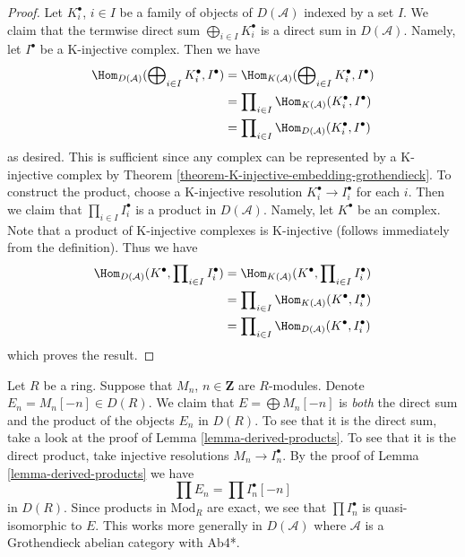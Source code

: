 \begin{proof}
Let $K^\bullet_i$, $i \in I$ be a family of objects of $D(\mathcal{A})$
indexed by a set $I$. We claim that the termwise direct sum
$\bigoplus_{i \in I} K^\bullet_i$ is a direct sum in $D(\mathcal{A})$.
Namely, let $I^\bullet$ be a K-injective complex. Then we have
\begin{align*}
\Hom_{D(\mathcal{A})}(\bigoplus\nolimits_{i \in I} K^\bullet_i, I^\bullet)
& =
\Hom_{K(\mathcal{A})}(\bigoplus\nolimits_{i \in I} K^\bullet_i, I^\bullet) \\
& =
\prod\nolimits_{i \in I} \Hom_{K(\mathcal{A})}(K^\bullet_i, I^\bullet) \\
& =
\prod\nolimits_{i \in I} \Hom_{D(\mathcal{A})}(K^\bullet_i, I^\bullet)
\end{align*}
as desired. This is sufficient since any complex can be represented
by a K-injective complex by
Theorem \ref{theorem-K-injective-embedding-grothendieck}.
To construct the product, choose a K-injective resolution
$K_i^\bullet \to I_i^\bullet$ for each $i$. Then we claim that
$\prod_{i \in I} I_i^\bullet$ is a product in $D(\mathcal{A})$.
Namely, let $K^\bullet$ be an complex. Note that a product of
K-injective complexes is K-injective (follows immediately from the
definition). Thus we have
\begin{align*}
\Hom_{D(\mathcal{A})}(K^\bullet, \prod\nolimits_{i \in I} I_i^\bullet)
& =
\Hom_{K(\mathcal{A})}(K^\bullet, \prod\nolimits_{i \in I} I_i^\bullet) \\
& =
\prod\nolimits_{i \in I} \Hom_{K(\mathcal{A})}(K^\bullet, I_i^\bullet) \\
& =
\prod\nolimits_{i \in I} \Hom_{D(\mathcal{A})}(K^\bullet, I_i^\bullet)
\end{align*}
which proves the result.
\end{proof}

\begin{remark}
\label{remark-direct-sum-product-derived}
Let $R$ be a ring. Suppose that $M_n$, $n \in \mathbf{Z}$ are $R$-modules.
Denote $E_n = M_n[-n] \in D(R)$. We claim that $E = \bigoplus M_n[-n]$ is
{\it both} the direct sum and the product of the objects $E_n$ in $D(R)$.
To see that it is the direct sum, take a look at the proof of
Lemma \ref{lemma-derived-products}.
To see that it is the direct product, take injective resolutions
$M_n \to I_n^\bullet$. By the proof of
Lemma \ref{lemma-derived-products}
we have
$$
\prod E_n = \prod I_n^\bullet[-n]
$$
in $D(R)$. Since products in $\text{Mod}_R$ are exact, we see that
$\prod I_n^\bullet$ is quasi-isomorphic to $E$. This works more generally
in $D(\mathcal{A})$ where $\mathcal{A}$ is a Grothendieck abelian
category with Ab4*.
\end{remark}

